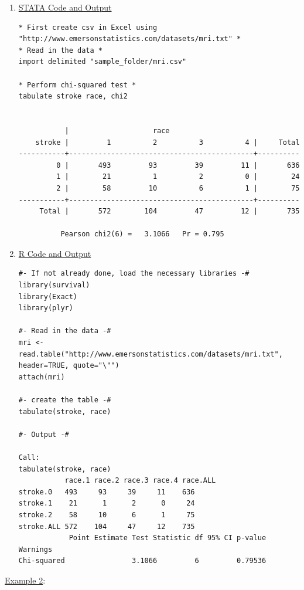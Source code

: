 \documentclass[11pt,letterpaper,fleqn]{report}
\begin{document}
\begin{enumerate}[]
\item \underline{STATA Code and Output}
{\scriptsize
\begin{verbatim}
* First create csv in Excel using "http://www.emersonstatistics.com/datasets/mri.txt" *
* Read in the data *
import delimited "sample_folder/mri.csv"

* Perform chi-squared test *
tabulate stroke race, chi2


           |                    race
    stroke |         1          2          3          4 |     Total
-----------+--------------------------------------------+----------
         0 |       493         93         39         11 |       636 
         1 |        21          1          2          0 |        24 
         2 |        58         10          6          1 |        75 
-----------+--------------------------------------------+----------
     Total |       572        104         47         12 |       735 

          Pearson chi2(6) =   3.1066   Pr = 0.795

\end{verbatim}}


\item \underline{R Code and Output}
{\scriptsize
\begin{verbatim}
#- If not already done, load the necessary libraries -#
library(survival)
library(Exact)
library(plyr)

#- Read in the data -#
mri <- read.table("http://www.emersonstatistics.com/datasets/mri.txt", header=TRUE, quote="\"")
attach(mri)

#- create the table -#
tabulate(stroke, race)

#- Output -#

Call:
tabulate(stroke, race)
           race.1 race.2 race.3 race.4 race.ALL
stroke.0   493     93     39     11    636     
stroke.1    21      1      2      0     24     
stroke.2    58     10      6      1     75     
stroke.ALL 572    104     47     12    735     
            Point Estimate Test Statistic df 95% CI p-value Warnings
Chi-squared                3.1066         6         0.79536            
\end{verbatim}}

\end{enumerate}

\underline{Example 2}:
\end{document}

